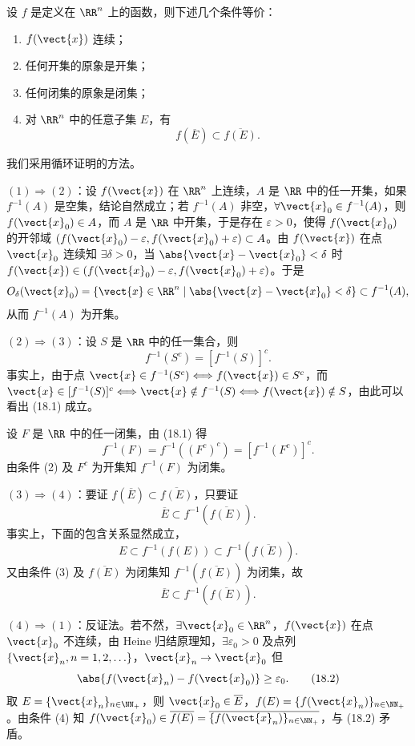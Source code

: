 \begin{xproposition}[18.2.1]
设 $f$ 是定义在 $\RR^n$ 上的函数，则下述几个条件等价：
\begin{enumerate}[label=(\arabic*)]
  \item $f(\vect{x})$ 连续；
  \item 任何开集的原象是开集；
  \item 任何闭集的原象是闭集；
  \item 对 $\RR^n$ 中的任意子集 $E$，有
  \[
    f(\overline E)\subset\overline{f(E)}.
  \]
\end{enumerate}
\end{xproposition}
\begin{xproof}
我们采用循环证明的方法。

$(1)\Rightarrow(2)$：设 $f(\vect{x})$ 在 $\RR^n$ 上连续，$A$ 是 $\RR$ 中的任一开集，如果 $f^{-1}(A)$ 是空集，结论自然成立；若 $f^{-1}(A)$ 非空，$\forall\vect{x}_0\in f^{-1}(A)$，则 $f(\vect{x}_0)\in A$，而 $A$ 是 $\RR$ 中开集，于是存在 $\varepsilon>0$，使得 $f(\vect{x}_0)$ 的开邻域 $(f(\vect{x}_0)-\varepsilon,f(\vect{x}_0)+\varepsilon)\subset A$。由 $f(\vect{x})$ 在点 $\vect{x}_0$ 连续知 $\exists\delta>0$，当 $\abs{\vect{x}-\vect{x}_0}<\delta$ 时 $f(\vect{x})\in(f(\vect{x}_0)-\varepsilon,f(\vect{x}_0)+\varepsilon)$。于是
\[
  O_\delta(\vect{x}_0)=\{\vect{x}\in\RR^n\mid\abs{\vect{x}-\vect{x}_0}<\delta\}
  \subset f^{-1}(A),
\]
从而 $f^{-1}(A)$ 为开集。

$(2)\Rightarrow(3)$：设 $S$ 是 $\RR$ 中的任一集合，则
\begin{equation}
  f^{-1}(S^c)=[f^{-1}(S)]^c.
  \tag{18.1}
\end{equation}
事实上，由于点 $\vect{x}\in f^{-1}(S^c)\Longleftrightarrow f(\vect{x})\in S^c$，而 $\vect{x}\in[f^{-1}(S)]^c\Longleftrightarrow\vect{x}\notin f^{-1}(S)\Longleftrightarrow f(\vect{x})\notin S$，由此可以看出 (18.1) 成立。

设 $F$ 是 $\RR$ 中的任一闭集，由 (18.1) 得
\[
  f^{-1}(F)=f^{-1}((F^c)^c)=[f^{-1}(F^c)]^c.
\]
由条件 (2) 及 $F^c$ 为开集知 $f^{-1}(F)$ 为闭集。

$(3)\Rightarrow(4)$：要证 $f(\overline E)\subset\overline{f(E)}$，只要证
\[
  \overline E\subset f^{-1}(\overline{f(E)}).
\]
事实上，下面的包含关系显然成立，
\[
  E\subset f^{-1}(f(E))\subset f^{-1}(\overline{f(E)}).
\]
又由条件 (3) 及 $\overline{f(E)}$ 为闭集知 $f^{-1}(\overline{f(E)})$ 为闭集，故
\[
  \overline E\subset f^{-1}(\overline{f(E)}).
\]

$(4)\Rightarrow(1)$：反证法。若不然，$\exists\vect{x}_0\in\RR^n$，$f(\vect{x})$ 在点 $\vect{x}_0$ 不连续，由 Heine 归结原理知，$\exists\varepsilon_0>0$ 及点列 $\{\vect{x}_n,n=1,2,\ldots\}$，$\vect{x}_n\to\vect{x}_0$ 但
\begin{equation}
  \abs{f(\vect{x}_n)-f(\vect{x}_0)}\ge\varepsilon_0.
  \tag{18.2}
\end{equation}
取 $E=\{\vect{x}_n\}_{n\in\NN_+}$，则 $\vect{x}_0\in\overline E$，$f(E)=\{f(\vect{x}_n)\}_{n\in\NN_+}$。由条件 (4) 知 $f(\vect{x}_0)\in\overline{f(E)}=\overline{\{f(\vect{x}_n)\}_{n\in\NN_+}}$，与 (18.2) 矛盾。
\end{xproof}

